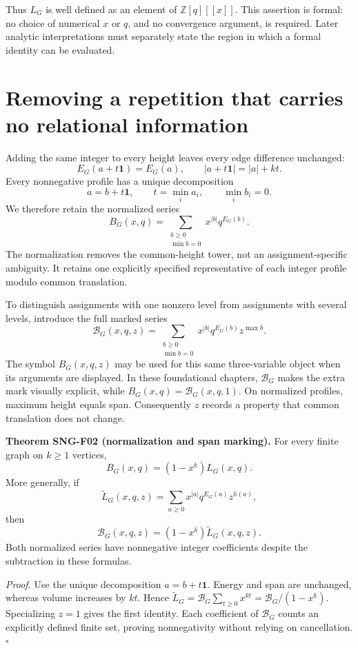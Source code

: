\documentclass[
  11pt,
  a4paper,
]{report}
\begin{document}
Thus \(L_G\) is well defined as an element of \(\mathbb Z[q][[x]]\).
This assertion is formal: no choice of numerical \(x\) or \(q\), and no
convergence argument, is required. Later analytic interpretations must
separately state the region in which a formal identity can be evaluated.

\hypertarget{removing-a-repetition-that-carries-no-relational-information}{%
\section{Removing a repetition that carries no relational
information}\label{removing-a-repetition-that-carries-no-relational-information}}

Adding the same integer to every height leaves every edge difference
unchanged: \[
E_G(a+t\mathbf1)=E_G(a),\qquad |a+t\mathbf1|=|a|+kt.
\] Every nonnegative profile has a unique decomposition \[
a=b+t\mathbf1,\qquad t=\min_i a_i,\qquad \min_i b_i=0.
\] We therefore retain the normalized series \[
B_G(x,q)=\sum_{\substack{b\ge0\\\min b=0}}x^{|b|}q^{E_G(b)}.
\] The normalization removes the common-height tower, not an
assignment-specific ambiguity. It retains one explicitly specified
representative of each integer profile modulo common translation.

To distinguish assignments with one nonzero level from assignments with
several levels, introduce the full marked series \[
\mathcal B_G(x,q,z)
=\sum_{\substack{b\ge0\\\min b=0}}
x^{|b|}q^{E_G(b)}z^{\max b}.
\] The symbol \(B_G(x,q,z)\) may be used for this same three-variable
object when its arguments are displayed. In these foundational chapters,
\(\mathcal B_G\) makes the extra mark visually explicit, while
\(B_G(x,q)=\mathcal B_G(x,q,1)\). On normalized profiles, maximum height
equals span. Consequently \(z\) records a property that common
translation does not change.

\textbf{Theorem SNG-F02 (normalization and span marking).} For every
finite graph on \(k\ge1\) vertices, \[
B_G(x,q)=(1-x^k)L_G(x,q).
\] More generally, if \[
\widetilde L_G(x,q,z)=\sum_{a\ge0}x^{|a|}q^{E_G(a)}z^{h(a)},
\] then \[
\mathcal B_G(x,q,z)=(1-x^k)\widetilde L_G(x,q,z).
\] Both normalized series have nonnegative integer coefficients despite
the subtraction in these formulas.

\emph{Proof.} Use the unique decomposition \(a=b+t\mathbf1\). Energy and
span are unchanged, whereas volume increases by \(kt\). Hence
\(\widetilde L_G=\mathcal B_G\sum_{t\ge0}x^{kt}=\mathcal B_G/(1-x^k)\).
Specializing \(z=1\) gives the first identity. Each coefficient of
\(\mathcal B_G\) counts an explicitly defined finite set, proving
nonnegativity without relying on cancellation. \(\square\)
\end{document}
